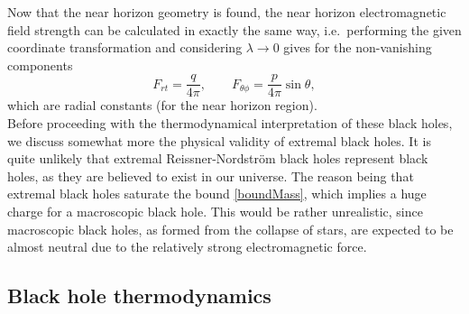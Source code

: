 \documentclass[12pt,twoside]{book}
\begin{document}
Now that the near horizon geometry is found, the near horizon electromagnetic field strength can be calculated in exactly the same way, i.e.\ performing the given coordinate transformation and considering $\lambda \rightarrow 0$ gives for the non-vanishing components
\begin{equation}
F_{rt} = \frac{q}{4\pi}, \qquad F_{\theta\phi} = \frac{p}{4 \pi}\sin\theta,
\end{equation}
which are radial constants (for the near horizon region).
\\

Before proceeding with the thermodynamical interpretation of these black holes, we discuss somewhat more the physical validity of extremal black holes. It is quite unlikely that extremal Reissner-Nordstr\"om black holes represent black holes, as they are believed to exist in our universe. The reason being that extremal black holes saturate the bound \eqref{boundMass}, which implies a huge charge for a macroscopic black hole. This would be rather unrealistic, since macroscopic black holes, as formed from the collapse of stars, are expected to be almost neutral due to the relatively strong electromagnetic force.


\subsection{Black hole thermodynamics}
\end{document}
